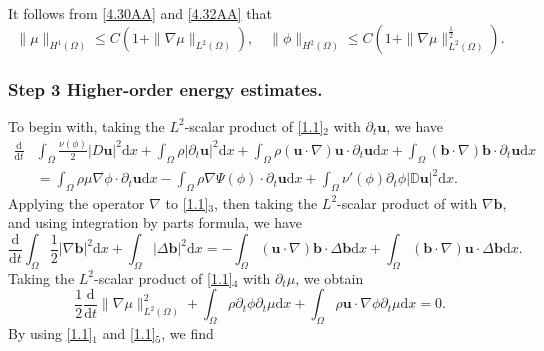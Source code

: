 \documentclass[11pt]{article}
\numberwithin{equation}{section}
\begin{document}
It follows from   \eqref{4.30AA} and \eqref{4.32AA}  that
\begin{equation}\label{4.24AA}
\|\mu\|_{H^1(\Omega)}\leq C(1 + \|\nabla\mu\|_{L^2(\Omega)}),\quad  \|\phi\|_{H^2(\Omega)}\leq C(1 + \|\nabla\mu\|_{L^2(\Omega)}^{\frac{1}{2}}). \end{equation}

\subsubsection*{Step 3 Higher-order energy estimates.}
\noindent
To begin with, taking the $L^2$-scalar product of \eqref{1.1}$_{2}$ with $\partial_t\mathbf{u}$, we have
\begin{equation}
\begin{split}\label{4.11}
\frac{\mathrm{d}}{\mathrm{d}t}&\int_{\Omega}\frac{\nu(\phi)}{2}|D
\mathbf{u}|^2\mathrm{d}x+\int_{\Omega}\rho|\partial_t\mathbf{u}|^2\mathrm{d}x+
\int_{\Omega}\rho(\mathbf{u}\cdot\nabla)\mathbf{u}
\cdot\partial_t\mathbf{u}\mathrm{d}x
+\int_{\Omega}(\mathbf{b}\cdot\nabla)\mathbf{b}\cdot\partial_t
\mathbf{u}\mathrm{d}x\\
&=\int_{\Omega}\rho\mu\nabla\phi\cdot\partial_t\mathbf{u}\mathrm{d}x
-\int_{\Omega}\rho\nabla\Psi(\phi)\cdot\partial_t\mathbf{u}\mathrm{d}x
+\int_{\Omega}\nu'(\phi)\partial_t\phi|\mathbb{D}\mathbf{u}|^2\mathrm{d}x.
\end{split}
\end{equation}
Applying the operator $\nabla$ to \eqref{1.1}$_{3}$, then taking the $L^2$-scalar product of with $\nabla\mathbf{b}$, and using integration by parts formula, we have
\begin{equation}\label{4.12}
\frac{\mathrm{d}}{\mathrm{d}t}\int_{\Omega}\frac{1}{2}|\nabla\mathbf{b}|^2\mathrm{d}x
+\int_{\Omega}|\Delta\mathbf{b}|^2\mathrm{d}x=
-\int_{\Omega}(\mathbf{u}\cdot\nabla)\mathbf{b}\cdot
\Delta\mathbf{b}\mathrm{d}x+
\int_{\Omega}(\mathbf{b}\cdot\nabla)\mathbf{u}\cdot
\Delta\mathbf{b}\mathrm{d}x.
\end{equation}
Taking the $L^2$-scalar product of \eqref{1.1}$_{4}$ with $\partial_t\mu$, we obtain
\begin{equation}\label{4.13}
\frac{1}{2}\frac{\mathrm{d}}{\mathrm{d}t}\|\nabla\mu\|_{L^2(\Omega)}^2
+\int_{\Omega}\rho\partial_t\phi \partial_t\mu\mathrm{d}x+\int_{\Omega}\rho\mathbf{u}\cdot\nabla\phi
\partial_t\mu\mathrm{d}x=0.
\end{equation}
By using  \eqref{1.1}$_{1}$ and  \eqref{1.1}$_{5}$, we find
\end{document}
